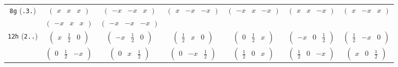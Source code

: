 \documentclass[fleqn,9pt,landscape]{jsarticle}
\begin{document}
\begin{center}
\begin{longtable}{ccccccc}
{\tt 8g} ({\tt .3.}) & $ \begin{pmatrix} x & x & x \end{pmatrix} $ & $ \begin{pmatrix} - x & - x & x \end{pmatrix} $ & $ \begin{pmatrix} x & - x & - x \end{pmatrix} $ & $ \begin{pmatrix} - x & x & - x \end{pmatrix} $ & $ \begin{pmatrix} x & x & - x \end{pmatrix} $ & $ \begin{pmatrix} x & - x & x \end{pmatrix} $ \\
& $ \begin{pmatrix} - x & x & x \end{pmatrix} $ & $ \begin{pmatrix} - x & - x & - x \end{pmatrix} $ & $  $ & $  $ & $  $ & $  $ \\ \hline
{\tt 12h} ({\tt 2..}) & $ \begin{pmatrix} x & \frac{1}{2} & 0 \end{pmatrix} $ & $ \begin{pmatrix} - x & \frac{1}{2} & 0 \end{pmatrix} $ & $ \begin{pmatrix} \frac{1}{2} & x & 0 \end{pmatrix} $ & $ \begin{pmatrix} 0 & \frac{1}{2} & x \end{pmatrix} $ & $ \begin{pmatrix} - x & 0 & \frac{1}{2} \end{pmatrix} $ & $ \begin{pmatrix} \frac{1}{2} & - x & 0 \end{pmatrix} $ \\
& $ \begin{pmatrix} 0 & \frac{1}{2} & - x \end{pmatrix} $ & $ \begin{pmatrix} 0 & x & \frac{1}{2} \end{pmatrix} $ & $ \begin{pmatrix} 0 & - x & \frac{1}{2} \end{pmatrix} $ & $ \begin{pmatrix} \frac{1}{2} & 0 & x \end{pmatrix} $ & $ \begin{pmatrix} \frac{1}{2} & 0 & - x \end{pmatrix} $ & $ \begin{pmatrix} x & 0 & \frac{1}{2} \end{pmatrix} $ \\ \hline

\end{longtable}
\end{center}
\end{document}

